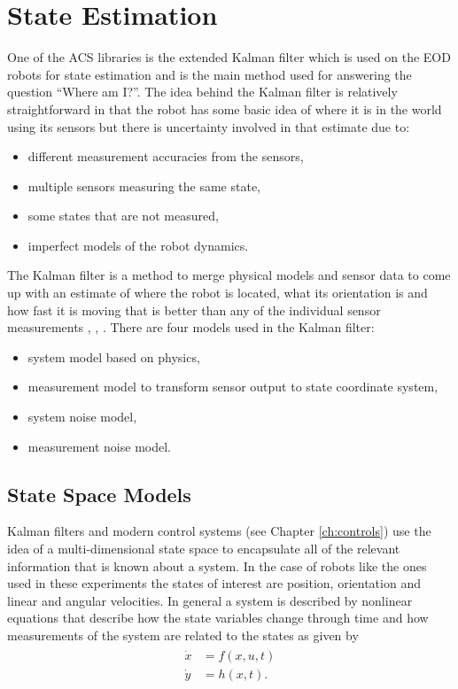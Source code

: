 \chapter{State Estimation}
\label{ch:estimation}
One of the ACS libraries is the extended Kalman filter which is used on the EOD robots for state estimation and is the main method used for answering the question ``Where am I?''. The idea behind the Kalman filter is relatively straightforward in that the robot has some basic idea of where it is in the world using its sensors but there is uncertainty involved in that estimate due to:
\begin{itemize}
\item different measurement accuracies from the sensors,
\item multiple sensors measuring the same state,
\item some states that are not measured,
\item imperfect models of the robot dynamics.
\end{itemize}

The Kalman filter is a method to merge physical models and sensor data to come up with an estimate of where the robot is located, what its orientation is and how fast it is moving that is better than any of the individual sensor measurements \cite{Simon06OptimalEstimation}, \cite{Grewal08}, \cite{Orderud05}. There are four models used in the Kalman filter:
\begin{itemize}
\item system model based on physics,
\item measurement model to transform sensor output to state coordinate system,
\item system noise model,
\item measurement noise model.
\end{itemize}

\section{State Space Models}
\label{sec:statespacemodels}
Kalman filters and modern control systems (see Chapter \ref{ch:controls}) use the idea of a multi-dimensional state space to encapsulate all of the relevant information that is known about a system. In the case of robots like the ones used in these experiments the states of interest are position, orientation and linear and angular velocities. In general a system is described by nonlinear equations that describe how the state variables change through time and how measurements of the system are related to the states as given by
\begin{align}
\label{eq:statespace}
\begin{split}
\dot{x} &= f(x,u,t) \\
\dot{y} &= h(x,t).
\end{split}
\end{align}


